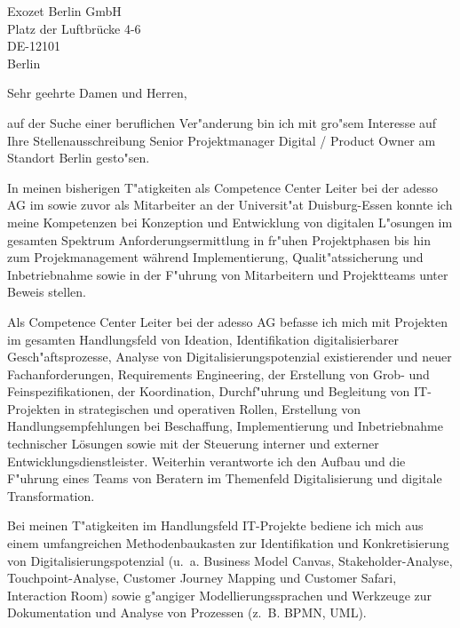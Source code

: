 \documentclass[11pt,a4paper]{dinbrief}
\date{\today}
\begin{document}
 
\begin{letter}  
{%
	Exozet Berlin GmbH\\
	Platz der Luftbrücke 4-6\\
	DE-12101\\
	Berlin
}
\subject{\bf Bewerbung Senior Projektmanager Digital / Product Owner}
\opening{Sehr geehrte Damen und Herren,}
auf der Suche einer beruflichen Ver"anderung bin ich mit gro"sem Interesse auf Ihre Stellenausschreibung Senior Projektmanager Digital / Product Owner am Standort Berlin  gesto"sen. 

In meinen bisherigen T"atigkeiten als Competence Center Leiter bei der adesso AG im sowie zuvor als Mitarbeiter an der Universit"at Duisburg-Essen konnte ich meine Kompetenzen bei Konzeption und Entwicklung von digitalen L"osungen im gesamten Spektrum Anforderungsermittlung in fr"uhen Projektphasen bis hin zum Projekmanagement während Implementierung, Qualit"atssicherung und Inbetriebnahme sowie in der F"uhrung von Mitarbeitern und Projektteams unter Beweis stellen.


Als Competence Center Leiter bei der adesso AG befasse ich mich mit Projekten im gesamten Handlungsfeld von Ideation, Identifikation digitalisierbarer Gesch"aftsprozesse, Analyse von Digitalisierungspotenzial existierender und neuer Fachanforderungen, Requirements Engineering, der Erstellung von Grob- und Feinspezifikationen, der Koordination, Durchf"uhrung und Begleitung von IT-Projekten in strategischen und operativen Rollen, Erstellung von Handlungsempfehlungen bei Beschaffung, Implementierung und Inbetriebnahme technischer Lösungen sowie mit der Steuerung interner und externer Entwicklungsdienstleister. Weiterhin verantworte ich den Aufbau und die F"uhrung eines Teams von Beratern im Themenfeld Digitalisierung und digitale Transformation.

Bei meinen T"atigkeiten im Handlungsfeld IT-Projekte bediene ich mich aus einem umfangreichen Methodenbaukasten zur Identifikation und Konkretisierung von Digitalisierungspotenzial (u.~a. Business Model Canvas, Stakeholder-Analyse, Touchpoint-Analyse, Customer Journey Mapping und Customer Safari, Interaction Room) sowie g"angiger Modellierungssprachen und Werkzeuge zur Dokumentation und Analyse von Prozessen (z.~B. BPMN, UML).


\end{letter}
\end{document}

